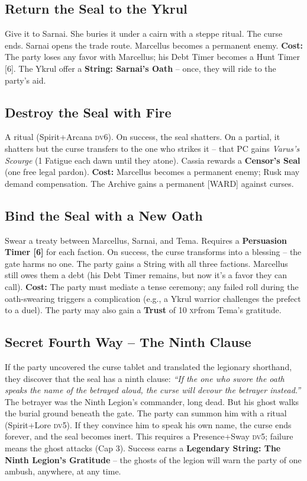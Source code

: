 \documentclass[10pt,twoside]{book}
\newcommand{\tag}[1]{\textsc{[#1]}}
\newcommand{\dv}{\textsc{dv}}
\newcommand{\xp}{\textsc{xp}}
\begin{document}
\subsection{Return the Seal to the Ykrul}
Give it to Sarnai. She buries it under a cairn with a steppe ritual. The curse ends. Sarnai opens the trade route. Marcellus becomes a permanent enemy. \textbf{Cost:} The party loses any favor with Marcellus; his Debt Timer becomes a Hunt Timer [6]. The Ykrul offer a \textbf{String: Sarnai's Oath} -- once, they will ride to the party's aid.

\subsection{Destroy the Seal with Fire}
A ritual (Spirit+Arcana \dv 6). On success, the seal shatters. On a partial, it shatters but the curse transfers to the one who strikes it -- that PC gains \textit{Varus's Scourge} (1 Fatigue each dawn until they atone). Cassia rewards a \textbf{Censor's Seal} (one free legal pardon). \textbf{Cost:} Marcellus becomes a permanent enemy; Rusk may demand compensation. The Archive gains a permanent \tag{WARD} against curses.

\subsection{Bind the Seal with a New Oath}
Swear a treaty between Marcellus, Sarnai, and Tema. Requires a \textbf{Persuasion Timer [6]} for each faction. On success, the curse transforms into a blessing -- the gate harms no one. The party gains a String with all three factions. Marcellus still owes them a debt (his Debt Timer remains, but now it's a favor they can call). \textbf{Cost:} The party must mediate a tense ceremony; any failed roll during the oath-swearing triggers a complication (e.g., a Ykrul warrior challenges the prefect to a duel). The party may also gain a \textbf{Trust} of 10 \xp from Tema's gratitude.

\subsection{Secret Fourth Way -- The Ninth Clause}

If the party uncovered the curse tablet and translated the legionary shorthand, they discover that the seal has a ninth clause: \textit{``If the one who swore the oath speaks the name of the betrayed aloud, the curse will devour the betrayer instead.''} The betrayer was the Ninth Legion's commander, long dead. But his ghost walks the burial ground beneath the gate. The party can summon him with a ritual (Spirit+Lore \dv 5). If they convince him to speak his own name, the curse ends forever, and the seal becomes inert. This requires a Presence+Sway \dv 5; failure means the ghost attacks (Cap 3). Success earns a \textbf{Legendary String: The Ninth Legion's Gratitude} -- the ghosts of the legion will warn the party of one ambush, anywhere, at any time.
\end{document}
